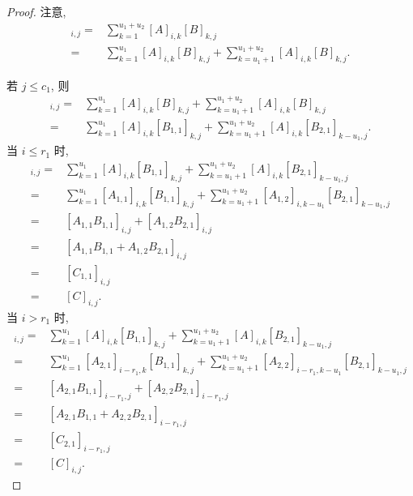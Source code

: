 \documentclass[../libro.tex]{subfiles}
\begin{document}
\begin{proof}
    注意,
    \begin{align*}
        [AB]_{i,j}
        = {} &
        \sum_{k=1}^{u_1+u_2}
        {[A]_{i,k} [B]_{k,j}}
        \\
        = {} &
        \sum_{k=1}^{u_1}
        {[A]_{i,k} [B]_{k,j}}
        +
        \sum_{k=u_1+1}^{u_1+u_2}
        {[A]_{i,k} [B]_{k,j}}.
    \end{align*}

    若 \(j \leq c_1\), 则
    \begin{align*}
        [AB]_{i,j}
        = {} &
        \sum_{k=1}^{u_1}
        {[A]_{i,k} [B]_{k,j}}
        +
        \sum_{k=u_1+1}^{u_1+u_2}
        {[A]_{i,k} [B]_{k,j}}
        \\
        = {} &
        \sum_{k=1}^{u_1}
        {[A]_{i,k} [B_{1,1}]_{k,j}}
        +
        \sum_{k=u_1+1}^{u_1+u_2}
        {[A]_{i,k} [B_{2,1}]_{k-u_1,j}}.
    \end{align*}
    当 \(i \leq r_1\) 时,
    \begin{align*}
        [AB]_{i,j}
        = {} &
        \sum_{k=1}^{u_1}
        {[A]_{i,k} [B_{1,1}]_{k,j}}
        +
        \sum_{k=u_1+1}^{u_1+u_2}
        {[A]_{i,k} [B_{2,1}]_{k-u_1,j}}
        \\
        = {} &
        \sum_{k=1}^{u_1}
        {[A_{1,1}]_{i,k} [B_{1,1}]_{k,j}}
        +
        \sum_{k=u_1+1}^{u_1+u_2}
        {[A_{1,2}]_{i,k-u_1} [B_{2,1}]_{k-u_1,j}}
        \\
        = {} &
        [A_{1,1} B_{1,1}]_{i,j}
        + [A_{1,2} B_{2,1}]_{i,j}
        \\
        = {} &
        [A_{1,1} B_{1,1} + A_{1,2} B_{2,1}]_{i,j}
        \\
        = {} &
        [C_{1,1}]_{i,j}
        \\
        = {} &
        [C]_{i,j}.
    \end{align*}
    当 \(i > r_1\) 时,
    \begin{align*}
        [AB]_{i,j}
        = {} &
        \sum_{k=1}^{u_1}
        {[A]_{i,k} [B_{1,1}]_{k,j}}
        +
        \sum_{k=u_1+1}^{u_1+u_2}
        {[A]_{i,k} [B_{2,1}]_{k-u_1,j}}
        \\
        = {} &
        \sum_{k=1}^{u_1}
        {[A_{2,1}]_{i-r_1,k} [B_{1,1}]_{k,j}}
        +
        \sum_{k=u_1+1}^{u_1+u_2}
        {[A_{2,2}]_{i-r_1,k-u_1} [B_{2,1}]_{k-u_1,j}}
        \\
        = {} &
        [A_{2,1} B_{1,1}]_{i-r_1,j}
        + [A_{2,2} B_{2,1}]_{i-r_1,j}
        \\
        = {} &
        [A_{2,1} B_{1,1} + A_{2,2} B_{2,1}]_{i-r_1,j}
        \\
        = {} &
        [C_{2,1}]_{i-r_1,j}
        \\
        = {} &
        [C]_{i,j}.
    \end{align*}


\end{proof}
\end{document}
